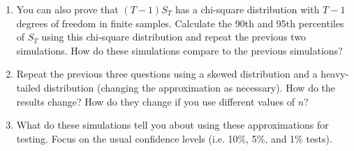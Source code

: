 \begin{hw}
\begin{enumerate}
  \item You can also prove that $(T-1) S_T$ has a chi-square
    distribution with $T-1$ degrees of freedom in finite samples.
    Calculate the 90th and 95th percentiles of $S_T$ using this
    chi-square distribution and repeat the previous two simulations.
    How do these simulations compare to the previous simulations?
  \item Repeat the previous three questions using a skewed
    distribution and a heavy-tailed distribution (changing the
    approximation as necessary). How do the results change? How do
    they change if you use different values of $n$?
  \item What do these simulations tell you about using these
    approximations for testing. Focus on the usual confidence levels
    (i.e. 10\%, 5\%, and 1\% tests).
  \end{enumerate}
\end{hw}


